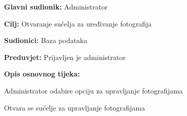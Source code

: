 					\noindent {}
					\begin{packed_item}
						
						\item \textbf{Glavni sudionik: }Administrator
						\item  \textbf{Cilj:} Otvaranje sučelja za uređivanje fotografija
						\item  \textbf{Sudionici:} Baza podataka
						\item  \textbf{Preduvjet:} Prijavljen je administrator
						\item  \textbf{Opis osnovnog tijeka:}
						
						\item[] \begin{packed_enum}
							
							\item Administrator odabire opciju za upravljanje fotografijama
							\item Otvara se sučelje za upravljanje fotografijama
						\end{packed_enum}
						
					\end{packed_item}
					
